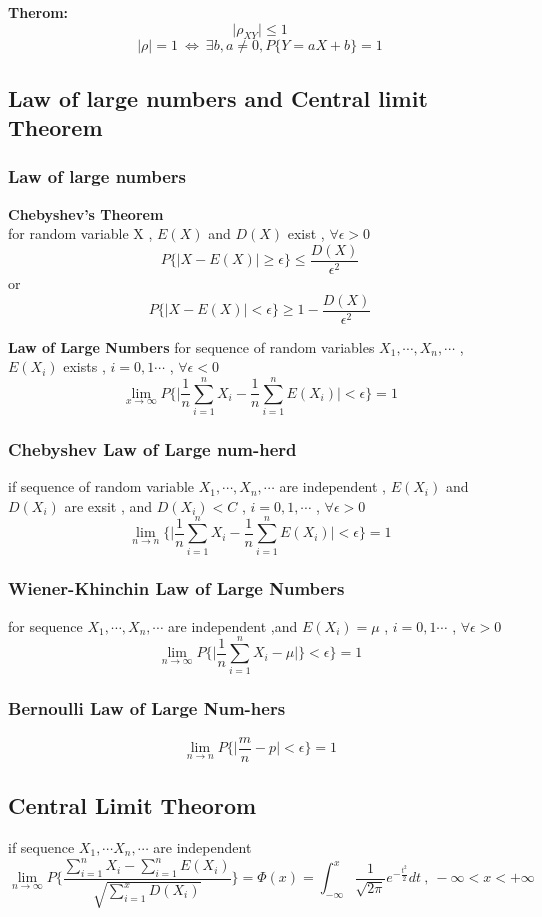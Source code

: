 \documentclass{ctexart}
\begin{document}
\textbf{Therom:}
\[\mid \rho_{XY}\mid \leq 1\]
\[\mid \rho\mid =1\ \Leftrightarrow\ \exists b,a\neq 0,P\{Y=aX+b\}=1\]

\subsection{Law of large numbers and Central limit Theorem}

\subsubsection{Law of large numbers}
\textbf{Chebyshev's Theorem} \\
for random variable X , \(E(X)\) and \(D(X)\) exist , \(\forall \epsilon >0\)
\[P\{\mid X-E(X)\mid \geq \epsilon\}\leq \frac{D(X)}{\epsilon^2}\]
or
\[P\{\mid X-E(X)\mid <\epsilon \}\geq 1-\frac{D(X)}{\epsilon^2}\]

\textbf{Law of Large Numbers}
for sequence of random variables \(X_1,\cdots , X_n , \cdots\) , \(E(X_i)\) exists , \(i=0,1\cdots\) , \(\forall \epsilon <0\)
\[\lim_{x \to \infty}P\{\mid \frac{1}{n}\sum_{i=1}^{n}X_i-\frac{1}{n}\sum_{i=1}^{n}E(X_i)\mid <\epsilon   \}=1\]

\subsubsection{Chebyshev Law of Large num-herd}
if sequence of random variable \(X_1,\cdots ,X_n,\cdots\) are independent , \(E(X_i)\) and \(D(X_i)\) are exsit , and \(D(X_i)<C\) , \(i=0,1,\cdots\) , \(\forall \epsilon >0\)
\[\lim_{n \to n}\{\mid \frac{1}{n}\sum_{i=1}^{n}X_i-\frac{1}{n}\sum_{i=1}^{n}E(X_i)\mid <\epsilon\}=1\]

\subsubsection{Wiener-Khinchin Law of Large Numbers}
for sequence \(X_1,\cdots , X_n , \cdots\) are independent ,and \(E(X_i)=\mu\) , \(i=0,1 \cdots\) , \(\forall \epsilon >0\)
\[\lim_{n\to \infty}P\{\mid \frac{1}{n}\sum_{i=1}^{n}X_i-\mu \mid\}<\epsilon\}=1\]

\subsubsection{Bernoulli Law of Large Num-hers}
\[\lim_{n\to n}P\{\mid \frac{m}{n}-p\mid <\epsilon\}=1\]

\subsection{Central Limit Theorom}
if sequence \(X_1,\cdots X_n ,\cdots\) are independent
\[\lim_{n\to \infty}P\{\frac{\sum_{i=1}^{n}X_i-\sum_{i=1}^{n}E(X_i)}{\sqrt{\sum_{i=1}^{x}D(X_i)}}\} =\Phi(x)=\int_{-\infty}^{x}\frac{1}{\sqrt{2\pi}}e^{-\frac{t^2}{2}}dt\ , \ -\infty <x <+ \infty  \]
\end{document}
